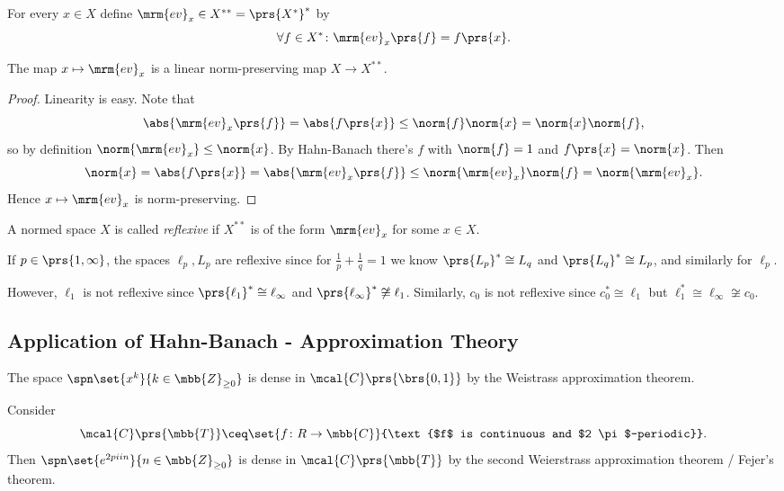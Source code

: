 \documentclass[10pt, twoside]{book}
\begin{document}
\begin{definition}
For every $x \in X$ define $\mrm{ev}_x \in X^{**} = \prs{X^*}^*$ by
\[\forall f \in X^* \colon \mrm{ev}_x\prs{f} = f\prs{x} \text{.}\]
\end{definition}

\begin{proposition}
The map $x \mapsto \mrm{ev}_x$ is a linear norm-preserving map $X \to X^{**}$.
\end{proposition}

\begin{proof}
Linearity is easy. Note that
\[\abs{\mrm{ev}_x\prs{f}} = \abs{f\prs{x}} \leq \norm{f} \norm{x} = \norm{x} \norm{f} \text{,}\]
so by definition $\norm{\mrm{ev}_x} \leq \norm{x}$. By Hahn-Banach there's $f$ with $\norm{f} = 1$ and $f\prs{x} = \norm{x}$. Then \[\norm{x} = \abs{f\prs{x}} = \abs{\mrm{ev}_x\prs{f}} \leq \norm{\mrm{ev}_x}\norm{f} = \norm{\mrm{ev}_x} \text{.}\]
Hence $x \mapsto \mrm{ev}_x$ is norm-preserving.
\end{proof}

\begin{definition}
A normed space $X$ is called \emph{reflexive} if $X^{**}$ is of the form $\mrm{ev}_x$ for some $x \in X$.
\end{definition}

\begin{example}
If $p \in \prs{1, \infty}$, the spaces $\ell_p, L_p$ are reflexive since for $\frac{1}{p} + \frac{1}{q} = 1$ we know $\prs{L_p}^* \cong L_q$ and $\prs{L_q}^* \cong L_p$, and similarly for $\ell_p$.

However, $\ell_1$ is not reflexive since $\prs{\ell_1}^* \cong \ell_\infty$ and $\prs{\ell_\infty}^* \not\cong \ell_1$.
Similarly, $c_0$ is not reflexive since $c_0^* \cong \ell_1$ but $\ell_1^* \cong \ell_\infty \not\cong c_0$.
\end{example}

\subsection{Application of Hahn-Banach - Approximation Theory}

\begin{example}
The space $\spn\set{x^k}{k \in \mbb{Z}_{\geq 0}}$ is dense in $\mcal{C}\prs{\brs{0,1}}$ by the Weistrass approximation theorem.
\end{example}

\begin{example}
Consider \[\mcal{C}\prs{\mbb{T}} \ceq \set{f \colon R \to \mbb{C}}{\text{$f$ is continuous and $2 \pi$-periodic}} \text{.}\]
Then $\spn\set{e^{2 pi i n}}{n \in \mbb{Z}_{\geq 0}}$ is dense in $\mcal{C}\prs{\mbb{T}}$ by the second Weierstrass approximation theorem / Fejer's theorem.
\end{example}
\end{document}
